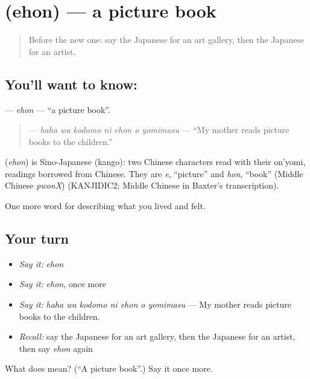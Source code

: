 \section[\texorpdfstring{\ja{えほん} (ehon)}{えほん (ehon)}]{ (ehon) — a picture book}

\label{lesson:JA-C504-ehon}



\begin{quote}
Before the new one: say the Japanese for an art gallery, then the Japanese for an artist.
\end{quote}

\subsection*{You'll want to know: }
\textbf{} — \emph{ehon} — \textquotedblleft{}a picture book\textquotedblright{}.

\begin{quote}
\textbf{   } — \emph{haha wa kodomo ni ehon o yomimasu} — \textquotedblleft{}My mother reads picture books to the children.\textquotedblright{}
\end{quote}

\begin{cousinweb}
\textbf{} (\emph{ehon}) is Sino-Japanese (kango): two Chinese characters read with their on'yomi, readings borrowed from Chinese. They are \emph{e}, \textquotedblleft{}picture\textquotedblright{} and \emph{hon}, \textquotedblleft{}book\textquotedblright{} (Middle Chinese \emph{pwonX}) (KANJIDIC2; Middle Chinese in Baxter's transcription).
\end{cousinweb}

\begin{grammarlens}[title={What you've built}]
One more word for describing what you lived and felt.
\end{grammarlens}

\subsection*{Your turn}
\begin{itemize}
\raggedright
  \item \emph{Say it:} \emph{ehon}
  \item \emph{Say it:} \emph{ehon}, once more
  \item \emph{Say it:} \emph{haha wa kodomo ni ehon o yomimasu} — My mother reads picture books to the children.
  \item \emph{Recall:} say the Japanese for an art gallery, then the Japanese for an artist, then say \emph{ehon} again
\end{itemize}

\begin{tcolorbox}[breakable,colback=teal!4,colframe=teal!35!black,title={Before you move on}]
What does  mean? (\textquotedblleft{}A picture book\textquotedblright{}.) Say it once more.
\end{tcolorbox}
